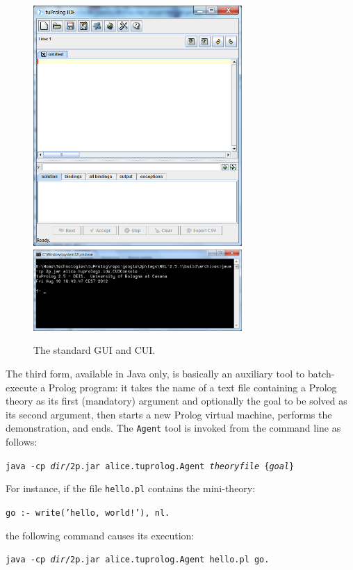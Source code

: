 \begin{figure}
  \includegraphics[width=300px]{images/tuprologIDE.png}\\
  \includegraphics[width=300px]{images/tuprologCUI.png}\\
  \caption{The standard \tuprolog{} GUI and CUI.}\label{fig:tuprologGUICUI}
\end{figure}

The third form, available in Java only, is basically an auxiliary tool to batch-execute a Prolog program: it takes the name of a text file containing a Prolog theory as its first (mandatory) argument and optionally the goal to be solved as its second argument, then starts a new Prolog virtual machine, performs the demonstration, and ends.
%
The \texttt{Agent} tool is invoked from the command line as follows:

\texttt{java -cp \textit{dir}/2p.jar alice.tuprolog.Agent \textit{theoryfile}
\{\textit{goal}\}}

\noindent For instance, if the file \verb|hello.pl| contains the mini-theory:

\texttt{go :- write('hello, world!'), nl.}

\noindent the following command causes its execution:

\texttt{java -cp \textit{dir}/2p.jar alice.tuprolog.Agent hello.pl go.}

